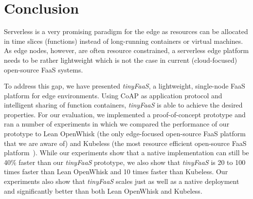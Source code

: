 \section{Conclusion}
\label{cha:conclusion}
Serverless is a very promising paradigm for the edge as resources can be allocated in time slices (functions) instead of long-running containers or virtual machines.
As edge nodes, however, are often resource constrained, a serverless edge platform needs to be rather lightweight which is not the case in current (cloud-focused) open-source FaaS systems.

To address this gap, we have presented \textit{tinyFaaS}, a lightweight, single-node FaaS platform for edge environments.
Using CoAP as application protocol and intelligent sharing of function containers, \textit{tinyFaaS} is able to achieve the desired properties.
For our evaluation, we implemented a proof-of-concept prototype and ran a number of experiments in which we compared the performance of our prototype to Lean OpenWhisk (the only edge-focused open-source FaaS platform that we are aware of) and Kubeless (the most resource efficient open-source FaaS platform~\cite{Palade2019-mo}).
While our experiments show that a native implementation can still be 40\% faster than our \textit{tinyFaaS} prototype, we also show that \textit{tinyFaaS} is 20 to 100 times faster than Lean OpenWhisk and 10 times faster than Kubeless.
Our experiments also show that \textit{tinyFaaS} scales just as well as a native deployment and significantly better than both Lean OpenWhisk and Kubeless.

